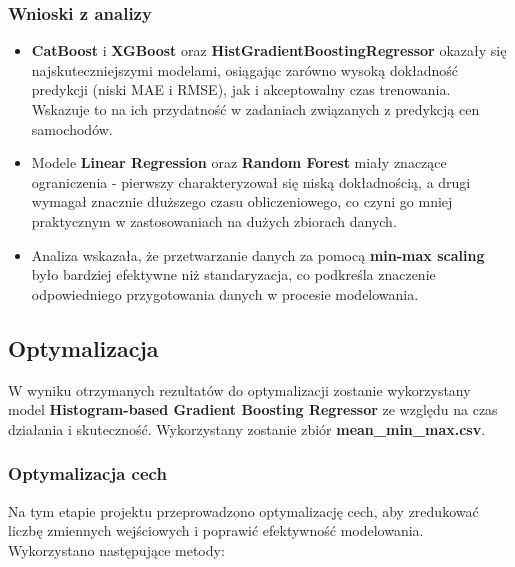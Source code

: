 \documentclass[10pt,letterpaper]{article}
\begin{document}
\subsubsection{Wnioski z analizy}

\begin{itemize}
\item \textbf{CatBoost} i \textbf{XGBoost} oraz \textbf{ HistGradientBoostingRegressor} okazały się najskuteczniejszymi modelami, osiągając zarówno wysoką dokładność predykcji (niski MAE i RMSE), jak i akceptowalny czas trenowania. Wskazuje to na ich przydatność w zadaniach związanych z predykcją cen samochodów.
\item Modele \textbf{Linear Regression} oraz \textbf{Random Forest} miały znaczące ograniczenia - pierwszy charakteryzował się niską dokładnością, a drugi wymagał znacznie dłuższego czasu obliczeniowego, co czyni go mniej praktycznym w zastosowaniach na dużych zbiorach danych.
\item Analiza wskazała, że przetwarzanie danych za pomocą \textbf{min-max scaling} było bardziej efektywne niż standaryzacja, co podkreśla znaczenie odpowiedniego przygotowania danych w procesie modelowania.
\end{itemize}

\newpage
\subsection{Optymalizacja}
W wyniku otrzymanych rezultatów do optymalizacji zostanie wykorzystany model \textbf{Histogram-based Gradient Boosting Regressor} ze względu na czas działania i skuteczność. Wykorzystany zostanie zbiór \textbf{mean\_min\_max.csv}.

\subsubsection{Optymalizacja cech}

Na tym etapie projektu przeprowadzono optymalizację cech, aby zredukować liczbę zmiennych wejściowych i poprawić efektywność modelowania. Wykorzystano następujące metody:
\end{document}
